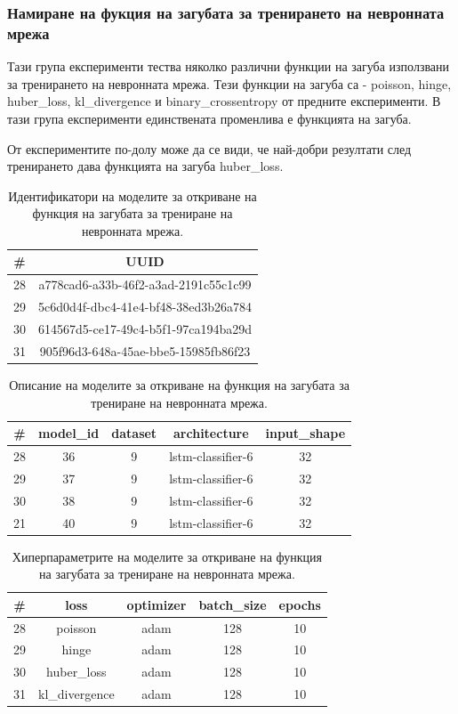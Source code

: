 \documentclass{article}
\begin{document}
\subsubsection{Намиране на фукция на загубата за тренирането на невронната мрежа}

Тази група експерименти тества няколко различни функции на загуба използвани за тренирането на невронната мрежа. Тези
функции на загуба са - poisson, hinge, huber\_loss, kl\_divergence и binary\_crossentropy от предните експерименти. В
тази група експерименти единствената променлива е функцията на загуба.

От експериментите по-долу може да се види, че най-добри резултати след тренирането дава функцията на загуба huber\_loss.

\begin{table}[H]
\centering
\captionsetup{justification=centering}
\begin{tabular}{|c||c|}
\hline
\# & UUID\\
\hline
28 & a778cad6-a33b-46f2-a3ad-2191c55c1c99\\
29 & 5c6d0d4f-dbc4-41e4-bf48-38ed3b26a784\\
30 & 614567d5-ce17-49c4-b5f1-97ca194ba29d\\
31 & 905f96d3-648a-45ae-bbe5-15985fb86f23\\
\hline
\end{tabular}
\caption{Идентификатори на моделите за откриване на функция на загубата за трениране на невронната мрежа.}
\end{table}

\begin{table}[H]
\centering
\captionsetup{justification=centering}
\begin{tabular}{|c||c|c|c|c|}
\hline
\# & model\_id & dataset & architecture & input\_shape\\
\hline
28 & 36 & 9 & lstm-classifier-6 & 32\\
29 & 37 & 9 & lstm-classifier-6 & 32\\
30 & 38 & 9 & lstm-classifier-6 & 32\\
21 & 40 & 9 & lstm-classifier-6 & 32\\
\hline
\end{tabular}
\caption{Описание на моделите за откриване на функция на загубата за трениране на невронната мрежа.}
\end{table}

\begin{table}[H]
\centering
\captionsetup{justification=centering}
\begin{tabular}{|c||c|c|c|c|}
\hline
\# & loss & optimizer & batch\_size & epochs\\
\hline
28 & poisson & adam & 128 & 10\\
29 & hinge & adam & 128 & 10\\
30 & huber\_loss & adam & 128 & 10\\
31 & kl\_divergence & adam & 128 & 10\\
\hline
\end{tabular}
\caption{Хиперпараметрите на моделите за откриване на функция на загубата за трениране на невронната мрежа.}
\end{table}
\end{document}
